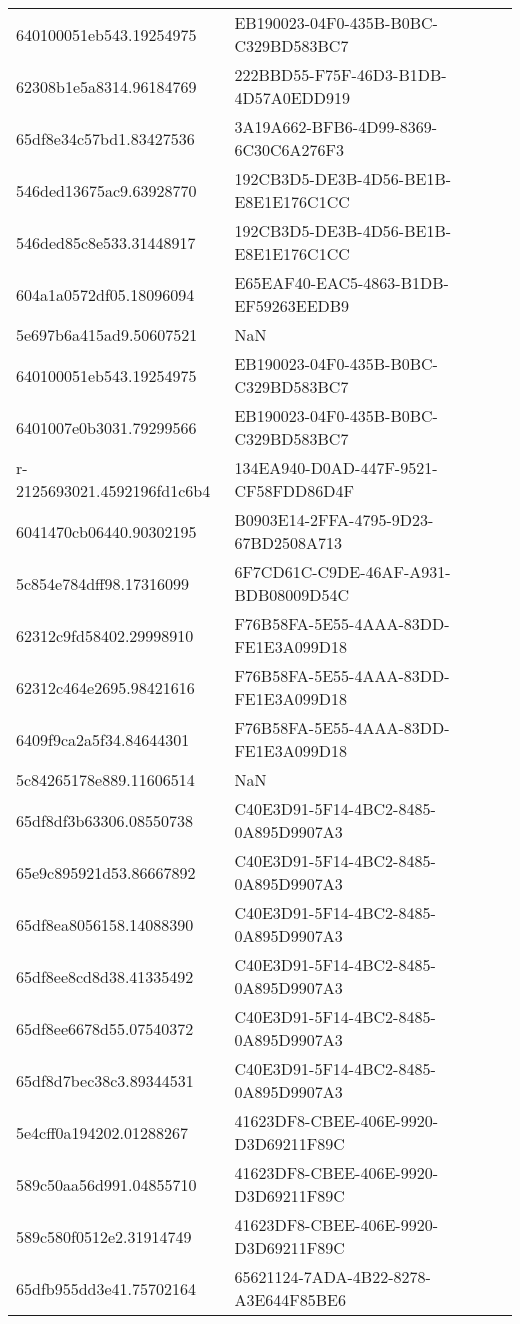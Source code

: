 \begin{tabular}{ll}
640100051eb543.19254975 & EB190023-04F0-435B-B0BC-C329BD583BC7 \\
62308b1e5a8314.96184769 & 222BBD55-F75F-46D3-B1DB-4D57A0EDD919 \\
65df8e34c57bd1.83427536 & 3A19A662-BFB6-4D99-8369-6C30C6A276F3 \\
546ded13675ac9.63928770 & 192CB3D5-DE3B-4D56-BE1B-E8E1E176C1CC \\
546ded85c8e533.31448917 & 192CB3D5-DE3B-4D56-BE1B-E8E1E176C1CC \\
604a1a0572df05.18096094 & E65EAF40-EAC5-4863-B1DB-EF59263EEDB9 \\
5e697b6a415ad9.50607521 & NaN \\
640100051eb543.19254975 & EB190023-04F0-435B-B0BC-C329BD583BC7 \\
6401007e0b3031.79299566 & EB190023-04F0-435B-B0BC-C329BD583BC7 \\
r-2125693021.4592196fd1c6b4 & 134EA940-D0AD-447F-9521-CF58FDD86D4F \\
6041470cb06440.90302195 & B0903E14-2FFA-4795-9D23-67BD2508A713 \\
5c854e784dff98.17316099 & 6F7CD61C-C9DE-46AF-A931-BDB08009D54C \\
62312c9fd58402.29998910 & F76B58FA-5E55-4AAA-83DD-FE1E3A099D18 \\
62312c464e2695.98421616 & F76B58FA-5E55-4AAA-83DD-FE1E3A099D18 \\
6409f9ca2a5f34.84644301 & F76B58FA-5E55-4AAA-83DD-FE1E3A099D18 \\
5c84265178e889.11606514 & NaN \\
65df8df3b63306.08550738 & C40E3D91-5F14-4BC2-8485-0A895D9907A3 \\
65e9c895921d53.86667892 & C40E3D91-5F14-4BC2-8485-0A895D9907A3 \\
65df8ea8056158.14088390 & C40E3D91-5F14-4BC2-8485-0A895D9907A3 \\
65df8ee8cd8d38.41335492 & C40E3D91-5F14-4BC2-8485-0A895D9907A3 \\
65df8ee6678d55.07540372 & C40E3D91-5F14-4BC2-8485-0A895D9907A3 \\
65df8d7bec38c3.89344531 & C40E3D91-5F14-4BC2-8485-0A895D9907A3 \\
5e4cff0a194202.01288267 & 41623DF8-CBEE-406E-9920-D3D69211F89C \\
589c50aa56d991.04855710 & 41623DF8-CBEE-406E-9920-D3D69211F89C \\
589c580f0512e2.31914749 & 41623DF8-CBEE-406E-9920-D3D69211F89C \\
65dfb955dd3e41.75702164 & 65621124-7ADA-4B22-8278-A3E644F85BE6 \\

\end{tabular}
